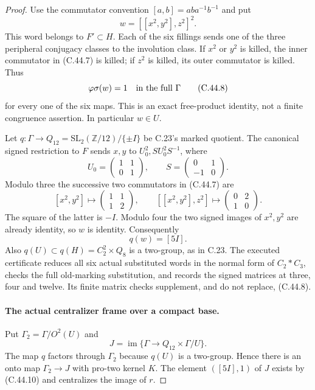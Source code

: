 \begin{proof}
Use the commutator convention $[a,b]=aba^{-1}b^{-1}$ and put
\[
                         w=[[x^2,y^2],z^2]^2.          \tag{C.44.7}
\]
This word belongs to $F'\subset H$. Each of the six fillings
sends one of the three peripheral conjugacy classes to the
involution class. If $x^2$ or $y^2$ is killed, the inner
commutator in (C.44.7) is killed; if $z^2$ is killed, its
outer commutator is killed. Thus
\[
                       \varphi\sigma(w)=1
               \quad\hbox{in the full }\Gamma          \tag{C.44.8}
\]
for every one of the six maps. This is an exact free-product
identity, not a finite congruence assertion. In particular $w\in U$.

Let $q:\Gamma\to Q_{12}=\mathrm{SL}_2(\mathbb Z/12)/\{\pm I\}$
be C.23's marked quotient. The canonical signed restriction to
$F$ sends $x,y$ to $U_0^2,SU_0^2S^{-1}$, where
\[
 U_0=\begin{pmatrix}1&1\\0&1\end{pmatrix},\qquad
 S=\begin{pmatrix}0&1\\-1&0\end{pmatrix}.
\]
Modulo three the successive two commutators in (C.44.7) are
\[
 [x^2,y^2]\longmapsto\begin{pmatrix}1&1\\1&2\end{pmatrix},
 \qquad
 [[x^2,y^2],z^2]\longmapsto\begin{pmatrix}0&2\\1&0\end{pmatrix}.
                                                               \tag{C.44.9}
\]
The square of the latter is $-I$. Modulo four the two signed
images of $x^2,y^2$ are already identity, so $w$ is identity.
Consequently
\[
                         q(w)=[5I].                   \tag{C.44.10}
\]
Also $q(U)\subset q(H)=C_2^2\times Q_8$ is a two-group,
as in C.23. The executed certificate
reduces all six actual substituted words in the normal form of
$C_2*C_3$, checks the full old-marking substitution, and records
the signed matrices at three, four and twelve. Its finite matrix
checks supplement, and do not replace, (C.44.8).

\paragraph{The actual centralizer frame over a compact base.}
Put $\Gamma_2=\Gamma/O^2(U)$ and
\[
 J=\operatorname{im}\{\Gamma\to Q_{12}\times\Gamma/U\}.
\]
The map $q$ factors through $\Gamma_2$ because $q(U)$ is a
two-group. Hence there is an onto map $\Gamma_2\to J$ with
pro-two kernel $K$. The element $([5I],1)$ of $J$ exists by
(C.44.10) and centralizes the image of $r$.


\end{proof}
